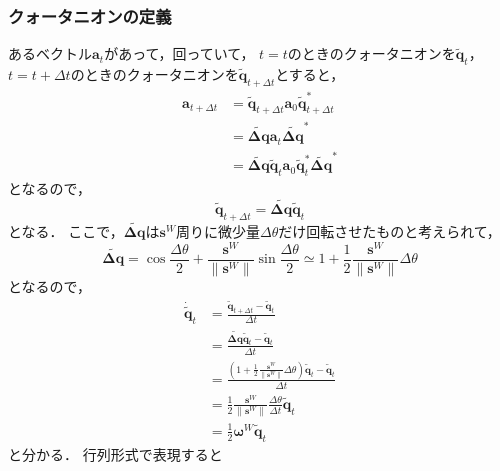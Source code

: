 \subsubsection{クォータニオンの定義}
あるベクトル$\boldsymbol{a}_{t}$があって，回っていて，
$t=t$のときのクォータニオンを$\tilde{\boldsymbol{q}}_{t}$，
$t=t+\Delta t$のときのクォータニオンを$\tilde{\boldsymbol{q}}_{t+\Delta t}$とすると，
\begin{align}
  \boldsymbol{a}_{t+\Delta t} &= \tilde{\boldsymbol{q}}_{t+\Delta t} \boldsymbol{a}_{0} \tilde{\boldsymbol{q}}_{t+\Delta t}^{\ast}\\
  &= \tilde{\boldsymbol{\Delta q}} \boldsymbol{a}_{t} \tilde{\boldsymbol{\Delta q}}^{\ast}\\
  &= \tilde{\boldsymbol{\Delta q}} \tilde{\boldsymbol{q}}_{t} \boldsymbol{a}_{0} \tilde{\boldsymbol{q}}_{t}^{\ast} \tilde{\boldsymbol{\Delta q}}^{\ast}
\end{align}
となるので，
\begin{equation}
  \tilde{\boldsymbol{q}}_{t+\Delta t}= \tilde{\boldsymbol{\Delta q}} \tilde{\boldsymbol{q}}_{t}
\end{equation}
となる．
ここで，$\tilde{\boldsymbol{\Delta q}}$は$\boldsymbol{s}^{W}$周りに微少量$\Delta \theta$だけ回転させたものと考えられて，
\begin{equation}
  \tilde{\boldsymbol{\Delta q}} = \cos \frac{\Delta \theta}{2} + \frac{\boldsymbol{s}^{W}}{\lVert \boldsymbol{s}^{W} \rVert} \sin \frac{\Delta \theta}{2} \simeq 1 + \frac{1}{2} \frac{\boldsymbol{s}^{W}}{\lVert \boldsymbol{s}^{W} \rVert} \Delta \theta
\end{equation}
となるので，
\begin{align}
  \dot{\tilde{\boldsymbol{q}}}_{t} &= \frac{\tilde{\boldsymbol{q}}_{t+\Delta t} - \tilde{\boldsymbol{q}}_{t}}{\Delta t}\\
  &= \frac{\tilde{\boldsymbol{\Delta q}} \tilde{\boldsymbol{q}}_{t} - \tilde{\boldsymbol{q}}_{t}}{\Delta t}\\
  &= \frac{\left(1 + \frac{1}{2} \frac{\boldsymbol{s}^{W}}{\lVert \boldsymbol{s}^{W} \rVert} \Delta \theta\right) \tilde{\boldsymbol{q}}_{t} - \tilde{\boldsymbol{q}}_{t}}{\Delta t}\\
  &= \frac{1}{2} \frac{\boldsymbol{s}^{W}}{\lVert \boldsymbol{s}^{W} \rVert} \frac{\Delta \theta}{\Delta t} \tilde{\boldsymbol{q}}_{t}\\
  &= \frac{1}{2} \boldsymbol{\omega}^{W} \tilde{\boldsymbol{q}}_{t}
\end{align}
と分かる．
行列形式で表現すると
